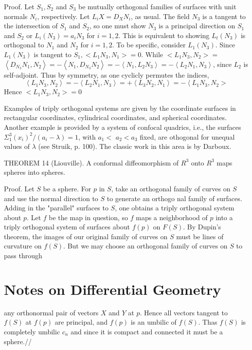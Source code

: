 \documentclass[10pt]{article}
\begin{document}
Proof. Let $S_{1}, S_{2}$ and $S_{3}$ be mutually orthogonal families of surfaces with unit normals $N_{i}$, respectively. Let $L_{i} X=D_{X} N_{i}$, as usual. The field $N_{3}$ is a tangent to the intersection of $S_{1}$ and $S_{2}$, so one must show $N_{3}$ is a principal direction on $S_{1}$ and $S_{2}$ or $L_{i}\left(N_{3}\right)=a_{i} N_{3}$ for $i=1,2$. This is equivalent to showing $L_{t}\left(N_{3}\right)$ is orthogonal to $N_{1}$ and $N_{2}$ for $i=1,2$. To be specific, consider $L_{1}\left(N_{3}\right)$. Since $L_{1}\left(N_{3}\right)$ is tangent to $S_{1},<L_{1} N_{3}, N_{1}>=0$. While $<L_{1} N_{3}, N_{2}>=$ $\left\langle D_{N_{3}} N_{1}, N_{2}\right\rangle=-\left\langle N_{1}, D_{N_{3}} N_{2}\right\rangle=-\left\langle N_{1}, L_{2} N_{3}\right\rangle=-\left\langle L_{2} N_{1}, N_{3}\right\rangle$, since $L_{2}$ is self-adjoint. Thus by symmetry, as one cyclicly permutes the indices,
$$
\left\langle L_{1} N_{3}, N_{2}\right\rangle=-\left\langle L_{2} N_{1}, N_{3}\right\rangle=+\left\langle L_{3} N_{2}, N_{1}\right\rangle=-\left\langle L_{1} N_{3}, N_{2}>\right.
$$
Hence $<L_{1} N_{3}, N_{2}>=0$

Examples of triply orthogonal systems are given by the coordinate surfaces in rectangular coordinates, cylindrical coordinates, and spherical coordinates. Another example is provided by a system of confocal quadrics, i.e., the surfaces $\Sigma_{1}^{3}\left(x_{i}\right)^{2} /\left(a_{i}-\lambda\right)=1$, with $a_{1}<$ $a_{2}<a_{3}$ fixed, are othogonal for unequal values of $\lambda$ (see Struik, p. 100). The classic work in this area is by Darboux.

THEOREM 14 (Liouville). A conformal diffeomorphism of $R^{3}$ onto $R^{3}$ maps spheres into spheres.

Proof. Let $S$ be a sphere. For $p$ in $S$, take an orthogonal family of curves on $S$ and use the normal direction to $S$ to generate an orthogo nal family of surfaces. Adding in the "parallel" surfaces to $S$, one obtains a triply orthogonal system about $p$. Let $f$ be the map in question, so $f$ maps a neighborhood of $p$ into a triply orthogonal system of surfaces about $f(p)$ on $F(S)$. By Dupin's theorem, the images of our original family of curves on $S$ must be lines of curvature on $f(S)$. But we may choose an orthogonal family of curves on $S$ to pass through

\section{Notes on Differential Geometry}
any orthonormal pair of vectors $X$ and $Y$ at $p$. Hence all vectors tangent to $f(S)$ at $f(p)$ are principal, and $f(p)$ is an umbilic of $f(S)$. Thas $f(S)$ is completely umbilic $c_{n}$ and since it is compact and connected it must be a sphere.//
\end{document}
